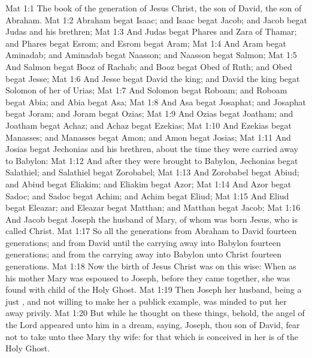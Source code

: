 \vs Mat 1:1 The book of the generation of Jesus Christ, the son of David, the son of Abraham.
\vs Mat 1:2 Abraham begat Isaac; and Isaac begat Jacob; and Jacob begat Judas and his brethren;
\vs Mat 1:3 And Judas begat Phares and Zara of Thamar; and Phares begat Esrom; and Esrom begat Aram;
\vs Mat 1:4 And Aram begat Aminadab; and Aminadab begat Naasson; and Naasson begat Salmon;
\vs Mat 1:5 And Salmon begat Booz of Rachab; and Booz begat Obed of Ruth; and Obed begat Jesse;
\vs Mat 1:6 And Jesse begat David the king; and David the king begat Solomon of her  of Urias;
\vs Mat 1:7 And Solomon begat Roboam; and Roboam begat Abia; and Abia begat Asa;
\vs Mat 1:8 And Asa begat Josaphat; and Josaphat begat Joram; and Joram begat Ozias;
\vs Mat 1:9 And Ozias begat Joatham; and Joatham begat Achaz; and Achaz begat Ezekias;
\vs Mat 1:10 And Ezekias begat Manasses; and Manasses begat Amon; and Amon begat Josias;
\vs Mat 1:11 And Josias begat Jechonias and his brethren, about the time they were carried away to Babylon:
\vs Mat 1:12 And after they were brought to Babylon, Jechonias begat Salathiel; and Salathiel begat Zorobabel;
\vs Mat 1:13 And Zorobabel begat Abiud; and Abiud begat Eliakim; and Eliakim begat Azor;
\vs Mat 1:14 And Azor begat Sadoc; and Sadoc begat Achim; and Achim begat Eliud;
\vs Mat 1:15 And Eliud begat Eleazar; and Eleazar begat Matthan; and Matthan begat Jacob;
\vs Mat 1:16 And Jacob begat Joseph the husband of Mary, of whom was born Jesus, who is called Christ.
\vs Mat 1:17 So all the generations from Abraham to David  fourteen generations; and from David until the carrying away into Babylon  fourteen generations; and from the carrying away into Babylon unto Christ  fourteen generations.
\vs Mat 1:18 Now the birth of Jesus Christ was on this wise: When as his mother Mary was espoused to Joseph, before they came together, she was found with child of the Holy Ghost.
\vs Mat 1:19 Then Joseph her husband, being a just , and not willing to make her a publick example, was minded to put her away privily.
\vs Mat 1:20 But while he thought on these things, behold, the angel of the Lord appeared unto him in a dream, saying, Joseph, thou son of David, fear not to take unto thee Mary thy wife: for that which is conceived in her is of the Holy Ghost.
